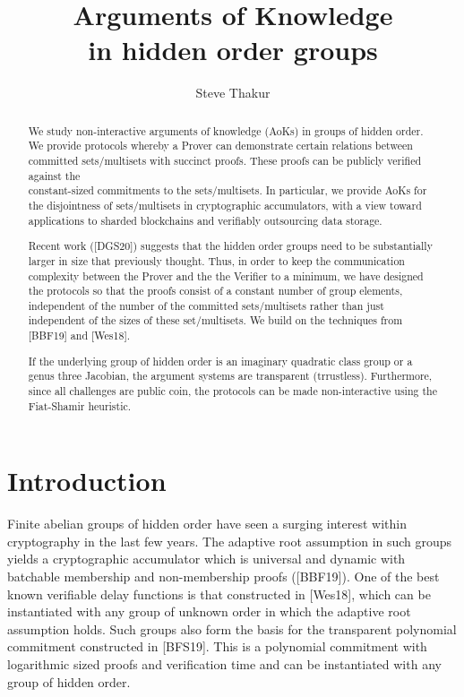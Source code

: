 \documentclass[11pt, lettersize, notitlepage, leqno, footskip=0.6cm]{article}
\numberwithin{equation}{section}
\begin{document}
 
\title{Arguments of Knowledge\\ in hidden order groups}
\author{Steve Thakur}
\affil{}
\date{\vspace{-6ex}}
 
\maketitle

\begin{abstract} We study non-interactive arguments of knowledge (AoKs) in groups of hidden order. We provide protocols whereby a Prover can demonstrate certain relations between committed sets/multisets with succinct proofs. These proofs can be publicly verified against the\\ constant-sized commitments to the sets/multisets. In particular, we provide AoKs for the disjointness of sets/multisets in cryptographic accumulators, with a view toward applications to sharded blockchains and verifiably outsourcing data storage. 

Recent work ([DGS20]) suggests that the hidden order groups need to be substantially larger in size that previously thought. Thus, in order to keep the communication complexity between the Prover and the the Verifier to a minimum, we have designed the protocols so that the proofs consist of a constant number of group elements, independent of the number of the committed sets/multisets rather than just independent of the sizes of these set/multisets. We build on the techniques from [BBF19] and [Wes18].

If the underlying group of hidden order is an imaginary quadratic class group or a genus three Jacobian, the argument systems are transparent (trrustless). Furthermore, since all challenges are public coin, the protocols can be made non-interactive using the Fiat-Shamir heuristic.\end{abstract}

\section{\fontsize{12}{12}\selectfont Introduction  }


Finite abelian groups of hidden order have seen a surging interest within cryptography in the last few years. The adaptive root assumption in such groups yields a cryptographic accumulator which is universal and dynamic with batchable membership and non-membership proofs ([BBF19]). One of the best known verifiable delay functions is that constructed in [Wes18], which can be instantiated with any group of unknown order in which the adaptive root assumption holds. Such groups also form the basis for the transparent polynomial commitment constructed in [BFS19]. This is a polynomial commitment with logarithmic sized proofs and verification time and can be instantiated with any group of hidden order.
\end{document}
